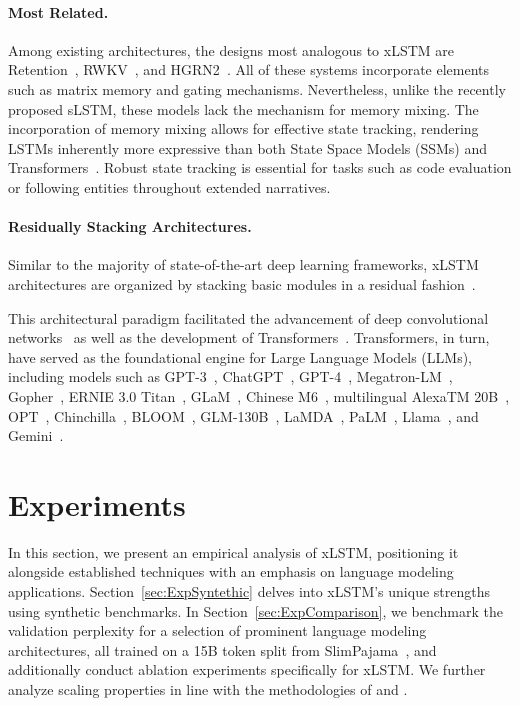 \paragraph{Most Related.} Among existing architectures, the designs most analogous to xLSTM are Retention~\citep{Sun:23arxiv}, RWKV~\citep{Peng:23arxivshort,Peng:24arxivshort}, and HGRN2~\citep{Qin:24arxiv}. All of these systems incorporate elements such as matrix memory and gating mechanisms. Nevertheless, unlike the recently proposed sLSTM, these models lack the mechanism for memory mixing. The incorporation of memory mixing allows for effective state tracking, rendering LSTMs inherently more expressive than both State Space Models (SSMs) and Transformers~\citep{Merrill:24,Deletang:23}. Robust state tracking is essential for tasks such as code evaluation or following entities throughout extended narratives.

\paragraph{Residually Stacking Architectures.} Similar to the majority of state-of-the-art deep learning frameworks, xLSTM architectures are organized by stacking basic modules in a residual fashion~\citep{Srivastava:15,He:16}.

This architectural paradigm facilitated the advancement of deep convolutional networks~\citep{He:16} as well as the development of Transformers~\citep{Vaswani:17}. Transformers, in turn, have served as the foundational engine for Large Language Models (LLMs), including models such as GPT-3~\citep{Brown:20short}, ChatGPT~\citep{Schulman:22short}, GPT-4~\citep{Achiam:23gpt4short}, Megatron-LM~\citep{Shoeybi:19}, Gopher~\citep{Rae:21short}, ERNIE 3.0 Titan~\citep{Wang:21arxivshort}, GLaM~\citep{Du:21glamshort}, Chinese M6~\citep{Lin:21}, multilingual AlexaTM 20B~\citep{Soltan:22}, OPT~\citep{Zhang:22opt}, Chinchilla~\citep{Hoffmann:22short}, BLOOM~\citep{Scao:22arxivshort}, GLM-130B~\citep{Zeng:22arxivshort}, LaMDA~\citep{Thoppilan:22short}, PaLM~\citep{Chowdhery:22short}, Llama~\citep{Touvron:23arxiv}, and Gemini~\citep{GeminiTeam:23arxiv,Reid:24arxiv}.

\section{Experiments}
\label{sec:Exp}

In this section, we present an empirical analysis of xLSTM, positioning it alongside established techniques with an emphasis on language modeling applications. Section~\ref{sec:ExpSyntethic} delves into xLSTM's unique strengths using synthetic benchmarks. In Section~\ref{sec:ExpComparison}, we benchmark the validation perplexity for a selection of prominent language modeling architectures, all trained on a 15B token split from SlimPajama~\citep{Soboleva:23}, and additionally conduct ablation experiments specifically for xLSTM. We further analyze scaling properties in line with the methodologies of \citet{Kaplan:20} and \citet{Brown:20short}. 

